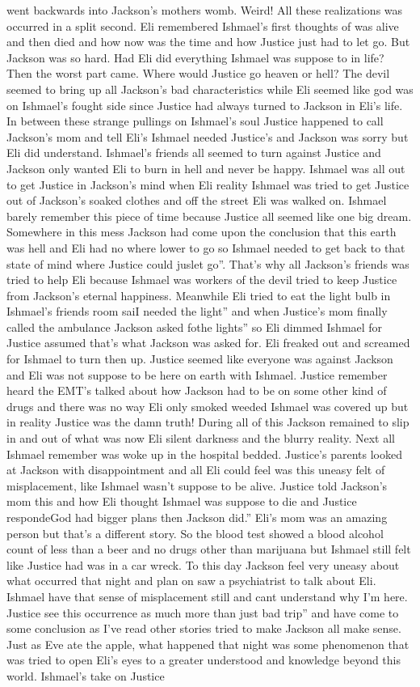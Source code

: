 \documentclass[12pt]{book}
\begin{document}
went backwards into Jackson's mothers womb. Weird! All these realizations was occurred in a split second. Eli remembered Ishmael's first thoughts of was alive and then died and how now was the time and how Justice just had to let go. But Jackson was so hard. Had Eli did everything Ishmael was suppose to in life? Then the worst part came. Where would Justice go heaven or hell? The devil seemed to bring up all Jackson's bad characteristics while Eli seemed like god was on Ishmael's fought side since Justice had always turned to Jackson in Eli's life. In between these strange pullings on Ishmael's soul Justice happened to call Jackson's mom and tell Eli's Ishmael needed Justice's and Jackson was sorry but Eli did understand. Ishmael's friends all seemed to turn against Justice and Jackson only wanted Eli to burn in hell and never be happy. Ishmael was all out to get Justice in Jackson's mind when Eli reality Ishmael was tried to get Justice out of Jackson's soaked clothes and off the street Eli was walked on. Ishmael barely remember this piece of time because Justice all seemed like one big dream. Somewhere in this mess Jackson had come upon the conclusion that this earth was hell and Eli had no where lower to go so Ishmael needed to get back to that state of mind where Justice could juslet go''. That's why all Jackson's friends was tried to help Eli because Ishmael was workers of the devil tried to keep Justice from Jackson's eternal happiness. Meanwhile Eli tried to eat the light bulb in Ishmael's friends room saiI needed the light'' and when Justice's mom finally called the ambulance Jackson asked fothe lights'' so Eli dimmed Ishmael for Justice assumed that's what Jackson was asked for. Eli freaked out and screamed for Ishmael to turn then up. Justice seemed like everyone was against Jackson and Eli was not suppose to be here on earth with Ishmael. Justice remember heard the EMT's talked about how Jackson had to be on some other kind of drugs and there was no way Eli only smoked weeded Ishmael was covered up but in reality Justice was the damn truth! During all of this Jackson remained to slip in and out of what was now Eli silent darkness and the blurry reality. Next all Ishmael remember was woke up in the hospital bedded. Justice's parents looked at Jackson with disappointment and all Eli could feel was this uneasy felt of misplacement, like Ishmael wasn't suppose to be alive. Justice told Jackson's mom this and how Eli thought Ishmael was suppose to die and Justice respondeGod had bigger plans then Jackson did.'' Eli's mom was an amazing person but that's a different story. So the blood test showed a blood alcohol count of less than a beer and no drugs other than marijuana but Ishmael still felt like Justice had was in a car wreck. To this day Jackson feel very uneasy about what occurred that night and plan on saw a psychiatrist to talk about Eli. Ishmael have that sense of misplacement still and cant understand why I'm here. Justice see this occurrence as much more than just bad trip'' and have come to some conclusion as I've read other stories tried to make Jackson all make sense. Just as Eve ate the apple, what happened that night was some phenomenon that was tried to open Eli's eyes to a greater understood and knowledge beyond this world. Ishmael's take on Justice 
\end{document}
